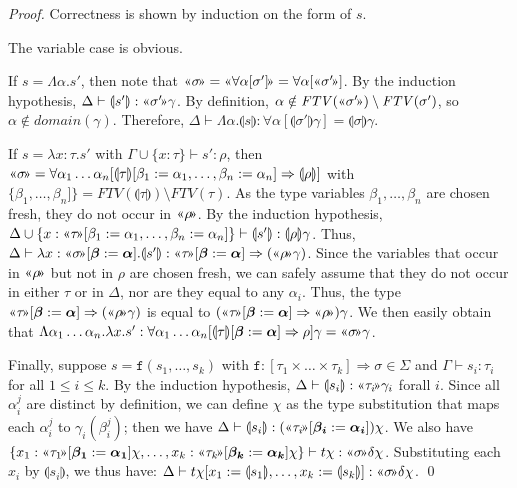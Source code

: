 \documentclass[runningheads,a4paper]{llncs}
\newcommand{\quant}[2]{\forall #1[#2]}
\newcommand{\typeinterpret}[1]{\text{\guillemotleft} #1\! \text{\guillemotright}}
\newcommand{\interpret}[1]{\llparenthesis #1 \rrparenthesis}
\newcommand{\arrtype}{\Rightarrow}
\newcommand{\abs}[2]{\lambda #1.#2}
\newcommand{\tabs}[2]{\Lambda #1.#2}
\newcommand{\FTV}{\mathit{FTV}}
\begin{document}
\begin{proof}
Correctness is shown by induction on the form of $s$.

The variable case is obvious.

If $s = \tabs{\alpha}{s'}$, then note that $\typeinterpret{\sigma} =
\typeinterpret{\quant{\alpha}{\sigma'}} = \quant{\alpha}{
\typeinterpret{\sigma'}}$.  By the induction hypothesis,
$\Delta \vdash \interpret{s'} : \typeinterpret{\sigma'}\gamma$.
By definition, $\alpha \notin \FTV(\typeinterpret{\sigma'}) \setminus
\FTV(\sigma')$, so $\alpha \notin \mathit{domain}(\gamma)$.  Therefore,
$\Delta \vdash \tabs{\alpha}{\interpret{s}} :
\quant{\alpha}{\interpret{\sigma'}\gamma} = \interpret{\sigma}\gamma$.

If $s = \abs{x:\tau}{s'}$ with $\Gamma \cup \{ x : \tau \} \vdash
s' : \rho$, then $\typeinterpret{\sigma} = \quant{\alpha_1 \dots
\alpha_n}{\interpret{\tau}[\beta_1:=\alpha_1,\dots,\beta_n:=\alpha_n]
\arrtype \interpret{\rho}}$ with $\{\beta_1,\dots,\beta_n]\} =
\FTV(\interpret{\tau}) \setminus \FTV(\tau)$.  As the type variables
$\beta_1,\dots,\beta_n$ are chosen fresh, they do not occur in
$\typeinterpret{\rho}$.
By the induction hypothesis, $\Delta \cup \{ x :
\typeinterpret{\tau}[\beta_1:=\alpha_1,\dots,\beta_n:=\alpha_n] \} \vdash
\interpret{s'} : \interpret{\rho}\gamma$.
Thus, $\Delta \vdash \abs{x:\typeinterpret{\sigma}[\vec{\beta}:=
\vec{\alpha}]}{\interpret{s'}} : \typeinterpret{\tau}[\vec{\beta}:=
\vec{\alpha}] \arrtype (\typeinterpret{\rho}\gamma)$.
Since the variables that occur in $\typeinterpret{\rho}$ but not in
$\rho$ are chosen fresh, we can safely assume that they do not occur in
either $\tau$ or in $\Delta$, nor are they equal to any $\alpha_i$.
Thus, the type $\typeinterpret{\tau}[\vec{\beta}:=\vec{\alpha}]
\arrtype (\typeinterpret{\rho}\gamma)$ is equal to
$(\typeinterpret{\tau}[\vec{\beta}:=\vec{\alpha}] \arrtype
\typeinterpret{\rho})\gamma$.
We then easily obtain that $\tabs{\alpha_1 \dots \alpha_n}{\abs{x}{s'}} :
\quant{\alpha_1 \dots \alpha_n}{\interpret{\tau}[\vec{\beta}:=\vec{
\alpha}] \arrtype \rho}\gamma = \typeinterpret{\sigma}\gamma$.

Finally, suppose $s = \mathtt{f}(s_1,\dots,s_k)$ with $\mathtt{f} :
[\tau_1 \times \dots \times \tau_k] \arrtype \sigma \in \Sigma$ and
$\Gamma \vdash s_i : \tau_i$ for all $1 \leq i \leq k$.  By the
induction hypothesis, $\Delta \vdash \interpret{s_i} : \typeinterpret{
\tau_i}\gamma_i$ forall $i$.
Since all $\alpha_i^j$ are distinct by definition, we can define
$\chi$ as the type substitution that maps each $\alpha_i^j$ to
$\gamma_i(\beta_i^j)$; then we have $\Delta \vdash \interpret{s_i} :
(\typeinterpret{\tau_i}[\vec{\beta_i}:=\vec{\alpha_i}])\chi$.
We also have $\{ x_1 : \typeinterpret{\tau_1}[\vec{\beta_1}:=
\vec{\alpha_1}]\chi, \dots, x_k : \typeinterpret{\tau_k}
[\vec{\beta_k}:=\vec{\alpha_k}]\chi \} \vdash t\chi :
\typeinterpret{\sigma}\delta\chi$.
Substituting each $x_i$ by $\interpret{s_i}$, we thus have:
$\Delta \vdash t\chi[x_1:=\interpret{s_1},\dots,x_k:=\interpret{s_k}]
: \typeinterpret{\sigma}\delta\chi$.
\qed
\end{proof}
\end{document}
